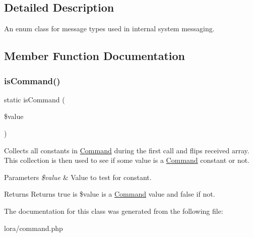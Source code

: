 \subsection{Detailed Description}
An enum class for message types used in internal system messaging. 

\subsection{Member Function Documentation}
\mbox{\label{class_lora_1_1_server_1_1_command_a77bf97cc94921f5dc95fa09cc9d87ffe}} 
\subsubsection{\texorpdfstring{is\+Command()}{isCommand()}}
{\footnotesize\ttfamily static is\+Command (\begin{DoxyParamCaption}\item[{}]{\$value }\end{DoxyParamCaption})\hspace{0.3cm}{\ttfamily [static]}}

Collects all constants in \hyperlink{class_lora_1_1_server_1_1_command}{Command} during the first call and flips received array. This collection is then used to see if some value is a \hyperlink{class_lora_1_1_server_1_1_command}{Command} constant or not. 
\begin{DoxyParams}{Parameters}
{\em \$value} & Value to test for constant. \\
\hline
\end{DoxyParams}
\begin{DoxyReturn}{Returns}
Returns true is \$value is a \hyperlink{class_lora_1_1_server_1_1_command}{Command} value and false if not. 
\end{DoxyReturn}



The documentation for this class was generated from the following file\+:\begin{DoxyCompactItemize}
\item 
lora/command.\+php\end{DoxyCompactItemize}
